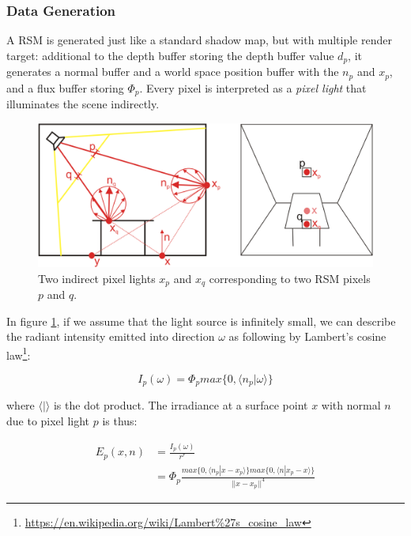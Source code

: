 \subsubsection{Data Generation}
A RSM is generated just like a standard shadow map, but with multiple render target: additional to the depth buffer storing the depth buffer value $d_p$, it generates a normal buffer and a world space position buffer with the $n_p$ and $x_p$, and a flux buffer storing $\Phi_p$. Every pixel is interpreted as a \textit{pixel light} that illuminates the scene indirectly. 

\begin{figure}\label{f:rsm-1}
\begin{center}
	\includegraphics[width=1.0\textwidth]{graphics/ir/ir-2-1}	
\end{center}
	\caption{Two indirect pixel lights $x_p$ and $x_q$ corresponding to two RSM pixels $p$ and $q$.}
\end{figure}

In figure \ref{f:rsm-1}, if we assume that the light source is infinitely small, we can describe the radiant intensity emitted into direction $\omega$ as following by Lambert's cosine law\footnote{\url{https://en.wikipedia.org/wiki/Lambert\%27s_cosine_law}}:

\begin{equation}\label{e:diffuse-radiant-intensity}
	I_p(\omega)=\Phi_p max\{ 0,\langle n_p|\omega \rangle \}
\end{equation}

where $\langle |\rangle$ is the dot product. The irradiance at a surface point $x$ with normal $n$ due to pixel light $p$ is thus:

\begin{equation*}
\begin{aligned}
	E_p(x,n)&=\frac{I_p(\omega)}{r^{r}} \\
			&=\Phi_p\frac{max\{0,\langle n_p|x-x_p \rangle\}max\{0,\langle n|x_p-x \rangle \}}{||x-x_p||^{4}}
\end{aligned}
\end{equation*}

